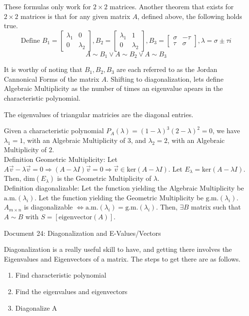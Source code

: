 \documentclass[11pt]{article}
\begin{document}
These formulas only work for $2\times 2$ matrices. Another theorem that exists for $2\times 2$ matrices is that for any given matrix $A$, defined above, the following holds true.
$$\text{Define } B_1=\begin{bmatrix}\lambda _1 & 0\\0 & \lambda _2\end{bmatrix}, 
B_2=\begin{bmatrix}\lambda _1 & 1\\0 & \lambda _2\end{bmatrix}, 
B_3=\begin{bmatrix}\sigma & -\tau\\\tau & \sigma\end{bmatrix},\lambda =\sigma\pm\tau i$$
$$A\sim B_1\vee A\sim B_2 \vee A\sim B_3$$

It is worthy of noting that $B_1, B_2, B_3$ are each referred to as the Jordan Cannonical Forms of the matrix $A$. Shifting to diagonalization, lets define Algebraic Multiplicity as the number of times an eigenvalue apears in the characteristic polynomial.

The eigenvalues of triangular matricies are the diagonal entries.

Given a characteristic polynomial $P_A(\lambda)=(1-\lambda)^3(2-\lambda)^2=0$, we have $\lambda _1=1$, with an Algebraic Multiplicity of $3$, and $\lambda _2=2$, with an Algebraic Multiplicity of $2$.\\

\noindent
Definition Geometric Multiplicity: Let $A\vec{v}-\lambda\vec{v}=0\Rightarrow(A-\lambda I)\vec{v}=0\Rightarrow \vec{v}\in\text{ker}(A-\lambda I)$. Let $E_\lambda =\text{ker}(A-\lambda I)$. Then, $\text{dim}(E_\lambda)$ is the Geometric Multiplicity of $\lambda$.\\

\noindent
Definition diagonalizable: Let the function yielding the Algebraic Multiplicity be $\text{a.m.}(\lambda_i)$. Let the function yielding the Geometric Multiplicity be $\text{g.m.}(\lambda_i)$. $A_{m\times n}$ is diagonalizable $\Leftrightarrow \text{a.m.}(\lambda_i)=\text{g.m.}(\lambda_i)$. Then, $\exists B$ matrix such that $A\sim B$ with $S=[\text{eigenvector}(A)]$.

\newpage
\begin{center}
Document 24: Diagonalization and E-Values/Vectors
\end{center}

Diagonalization is a really useful skill to have, and getting there involves the Eigenvalues and Eigenvectors of a matrix. The steps to get there are as follows.
\begin{center}\begin{minipage}[t]{0.7\textwidth}\begin{enumerate}
\item Find characteristic polynomial
\item Find the eigenvalues and eigenvectors
\item Diagonalize A\\
\end{enumerate}\end{minipage}\end{center}
\end{document}
